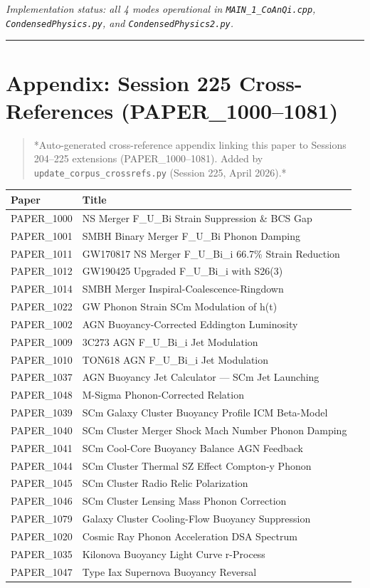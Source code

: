 \documentclass[12pt,a4paper]{article}
\begin{document}
\emph{Implementation status: all 4 modes operational in \texttt{MAIN\_{1\_CoAnQi}.cpp}, \texttt{CondensedPhysics.py}, and \texttt{CondensedPhysics2.py}.}

\medskip\hrule\medskip

\section{Appendix: Session 225 Cross-References (PAPER\_1000--1081)}

\begin{quote}
*Auto-generated cross-reference appendix linking this paper to
Sessions 204--225 extensions (PAPER\_1000--1081). Added by
\texttt{update\_{corpus\_crossrefs}.py} (Session 225, April 2026).*
\end{quote}

\begin{table}[H]
\centering
\small
\begin{tabularx}{\linewidth}{@{}>{\raggedright\arraybackslash}X>{\raggedright\arraybackslash}X@{}}
\toprule
Paper & Title \tabularnewline
\midrule
PAPER\_1000 & NS Merger F\_{U\_Bi} Strain Suppression \& BCS Gap \tabularnewline
PAPER\_1001 & SMBH Binary Merger F\_{U\_Bi} Phonon Damping \tabularnewline
PAPER\_1011 & GW170817 NS Merger F\_{U\_Bi\_i} 66.7\% Strain Reduction \tabularnewline
PAPER\_1012 & GW190425 Upgraded F\_{U\_Bi\_i} with S26(3) \tabularnewline
PAPER\_1014 & SMBH Merger Inspiral-Coalescence-Ringdown \tabularnewline
PAPER\_1022 & GW Phonon Strain SCm Modulation of h(t) \tabularnewline
PAPER\_1002 & AGN Buoyancy-Corrected Eddington Luminosity \tabularnewline
PAPER\_1009 & 3C273 AGN F\_{U\_Bi\_i} Jet Modulation \tabularnewline
PAPER\_1010 & TON618 AGN F\_{U\_Bi\_i} Jet Modulation \tabularnewline
PAPER\_1037 & AGN Buoyancy Jet Calculator --- SCm Jet Launching \tabularnewline
PAPER\_1048 & M-Sigma Phonon-Corrected Relation \tabularnewline
PAPER\_1039 & SCm Galaxy Cluster Buoyancy Profile ICM Beta-Model \tabularnewline
PAPER\_1040 & SCm Cluster Merger Shock Mach Number Phonon Damping \tabularnewline
PAPER\_1041 & SCm Cool-Core Buoyancy Balance AGN Feedback \tabularnewline
PAPER\_1044 & SCm Cluster Thermal SZ Effect Compton-y Phonon \tabularnewline
PAPER\_1045 & SCm Cluster Radio Relic Polarization \tabularnewline
PAPER\_1046 & SCm Cluster Lensing Mass Phonon Correction \tabularnewline
PAPER\_1079 & Galaxy Cluster Cooling-Flow Buoyancy Suppression \tabularnewline
PAPER\_1020 & Cosmic Ray Phonon Acceleration DSA Spectrum \tabularnewline
PAPER\_1035 & Kilonova Buoyancy Light Curve r-Process \tabularnewline
PAPER\_1047 & Type Iax Supernova Buoyancy Reversal \tabularnewline
\bottomrule
\end{tabularx}
\end{table}
\end{document}
